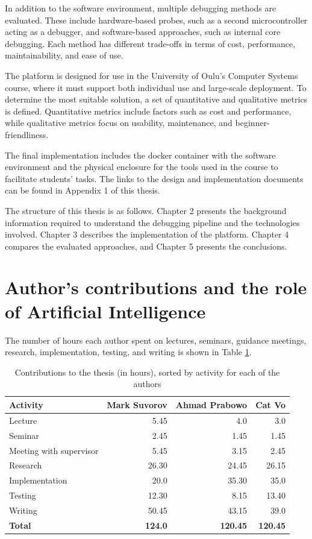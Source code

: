 In addition to the software environment, multiple debugging methods are evaluated. These include hardware-based probes, such as a second microcontroller acting as a debugger, and software-based approaches, such as internal core debugging. Each method has different trade-offs in terms of cost, performance, maintainability, and ease of use.

The platform is designed for use in the University of Oulu’s Computer Systems course, where it must support both individual use and large-scale deployment. To determine the most suitable solution, a set of quantitative and qualitative metrics is defined. Quantitative metrics include factors such as cost and performance, while qualitative metrics focus on usability, maintenance, and beginner-friendliness.

The final implementation includes the docker container with the software environment and the physical enclosure for the tools used in the course to facilitate students' tasks. The links to the design and implementation documents can be found in Appendix 1 of this thesis.

The structure of this thesis is as follows. Chapter 2 presents the background information required to understand the debugging pipeline and the technologies involved. Chapter 3 describes the implementation of the platform. Chapter 4 compares the evaluated approaches, and Chapter 5 presents the conclusions.

\section{Author's contributions and the role of Artificial Intelligence}

The number of hours each author spent on lectures, seminars, guidance meetings, research,
implementation, testing, and writing is shown in Table \ref{table:1}.

\begin{table}[h!]
    \centering
    \caption{Contributions to the thesis (in hours), sorted by activity for each of the authors}
    \begin{tabular}{|l|r|r|r|}
    \hline
    \textbf{Activity} & \multicolumn{1}{l|}{\textbf{Mark Suvorov}} & \multicolumn{1}{l|}{\textbf{Ahmad Prabowo}} & \multicolumn{1}{l|}{\textbf{Cat Vo}} \\ \hline
    Lecture & 5.45 & 4.0 & 3.0 \\
    Seminar & 2.45 & 1.45 & 1.45 \\
    Meeting with supervisor & 5.45 & 3.15 & 2.45 \\
    Research & 26.30 & 24.45 & 26.15 \\
    Implementation & 20.0 & 35.30 & 35.0 \\
    Testing & 12.30 & 8.15 & 13.40 \\
    Writing & 50.45 & 43.15 & 39.0 \\ \hline
    \textbf{Total} & \textbf{124.0} & \textbf{120.45} & \textbf{120.45} \\ \hline
    \end{tabular}
    \label{table:1}
    \end{table}


